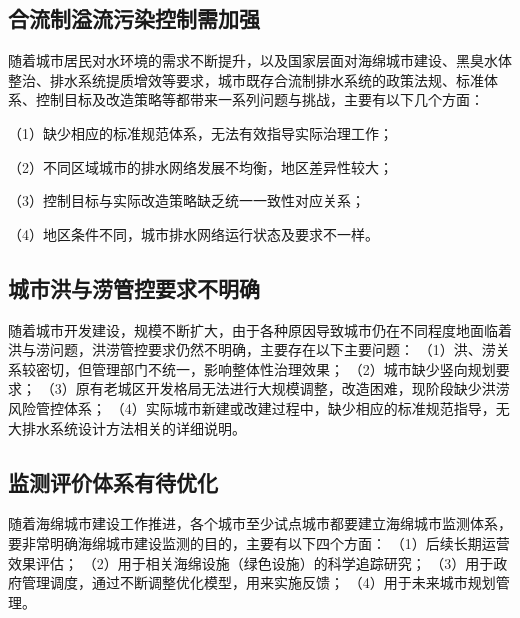 \documentclass[
]{book}
\begin{document}
\hypertarget{ux5408ux6d41ux5236ux6ea2ux6d41ux6c61ux67d3ux63a7ux5236ux9700ux52a0ux5f3a}{%
\subsection{合流制溢流污染控制需加强}\label{ux5408ux6d41ux5236ux6ea2ux6d41ux6c61ux67d3ux63a7ux5236ux9700ux52a0ux5f3a}}

随着城市居民对水环境的需求不断提升，以及国家层面对海绵城市建设、黑臭水体整治、排水系统提质增效等要求，城市既存合流制排水系统的政策法规、标准体系、控制目标及改造策略等都带来一系列问题与挑战，主要有以下几个方面：

（1）缺少相应的标准规范体系，无法有效指导实际治理工作；

（2）不同区域城市的排水网络发展不均衡，地区差异性较大；

（3）控制目标与实际改造策略缺乏统一一致性对应关系；

（4）地区条件不同，城市排水网络运行状态及要求不一样。

\hypertarget{ux57ceux5e02ux6d2aux4e0eux6d9dux7ba1ux63a7ux8981ux6c42ux4e0dux660eux786e}{%
\subsection{城市洪与涝管控要求不明确}\label{ux57ceux5e02ux6d2aux4e0eux6d9dux7ba1ux63a7ux8981ux6c42ux4e0dux660eux786e}}

随着城市开发建设，规模不断扩大，由于各种原因导致城市仍在不同程度地面临着洪与涝问题，洪涝管控要求仍然不明确，主要存在以下主要问题：
（1）洪、涝关系较密切，但管理部门不统一，影响整体性治理效果；
（2）城市缺少竖向规划要求；
（3）原有老城区开发格局无法进行大规模调整，改造困难，现阶段缺少洪涝风险管控体系；
（4）实际城市新建或改建过程中，缺少相应的标准规范指导，无大排水系统设计方法相关的详细说明。

\hypertarget{ux76d1ux6d4bux8bc4ux4ef7ux4f53ux7cfbux6709ux5f85ux4f18ux5316}{%
\subsection{监测评价体系有待优化}\label{ux76d1ux6d4bux8bc4ux4ef7ux4f53ux7cfbux6709ux5f85ux4f18ux5316}}

随着海绵城市建设工作推进，各个城市至少试点城市都要建立海绵城市监测体系，要非常明确海绵城市建设监测的目的，主要有以下四个方面：
（1）后续长期运营效果评估；
（2）用于相关海绵设施（绿色设施）的科学追踪研究；
（3）用于政府管理调度，通过不断调整优化模型，用来实施反馈；
（4）用于未来城市规划管理。
\end{document}
